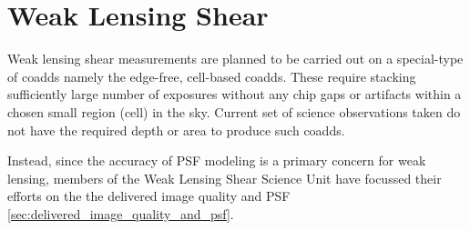 \section{Weak Lensing Shear}
\label{sec:weak_lensing_shear}

Weak lensing shear measurements are planned to be carried out on a special-type of coadds namely the edge-free, cell-based coadds.
These require stacking sufficiently large number of exposures without any chip gaps or artifacts within a chosen small region (cell) in the sky.
Current set of science observations taken do not have the required depth or area to produce such coadds.

Instead, since the accuracy of PSF modeling is a primary concern for weak lensing, members of the Weak Lensing Shear Science Unit have focussed their efforts on the the delivered image quality and PSF \ref{sec:delivered_image_quality_and_psf}.
